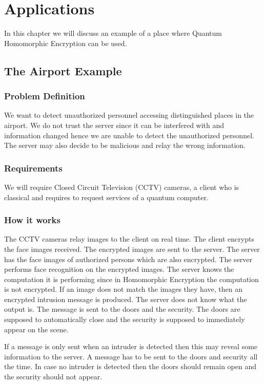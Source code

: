 \chapter{Applications}
In this chapter we will discuss an example of a place where Quantum Homomorphic Encryption can be used.
 
\section{The Airport Example}
\subsection{Problem Definition}
We want to detect unauthorized personnel accessing distinguished places in the airport. We do not trust the server since it can be interfered with and information changed hence we are unable to detect the unauthorized personnel. The server may also decide to be malicious and relay the wrong information. 

\subsection{Requirements}
We will require Closed Circuit Television (CCTV) cameras, a client who is classical and requires to request services of a quantum computer.

\subsection{How it works}
The CCTV cameras relay images to the client on real time. The client encrypts the face images received. The encrypted images are sent to the server. The server has the face images of authorized persons which are also encrypted. The server performs face recognition on the encrypted images. The server knows the computation it is performing since in Homomorphic Encryption the computation is not encrypted. If an image does not match the images they have, then an encrypted intrusion message is produced. The server does not know what the output is. The message is sent to the doors and the security. The doors are supposed to automatically close and the security is supposed to immediately appear on the scene.

If a message is only sent when an intruder is detected then this may reveal some information to the server. A message has to be sent to the doors and security all the time. In case no intruder is detected then the doors should remain open and the security should not appear.  

